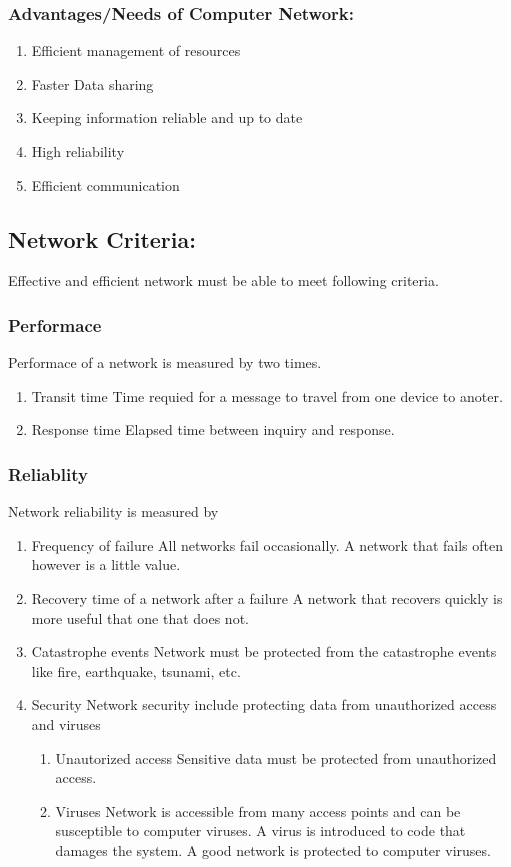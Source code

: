 \documentclass[11pt]{article}
\begin{document}
\subsubsection{Advantages/Needs of Computer Network:}
\label{sec:org07e17fa}
\begin{enumerate}
\item Efficient management of resources
\label{sec:org71c3d64}
\item Faster Data sharing
\label{sec:orgc71df5a}
\item Keeping information reliable and up to date
\label{sec:org68711f9}
\item High reliability
\label{sec:orgb7037c1}
\item Efficient communication
\label{sec:org1c1e376}
\end{enumerate}
\subsection{Network Criteria:}
\label{sec:org451ec03}
Effective and efficient network must be able to meet following criteria.
\subsubsection{Performace}
\label{sec:org939e43c}
Performace of a network is measured by two times.
\begin{enumerate}
\item Transit time
\label{sec:orgad8b35b}
Time requied for a message to travel from one device to anoter.
\item Response time
\label{sec:org875e993}
Elapsed time between inquiry and response.
\end{enumerate}
\subsubsection{Reliablity}
\label{sec:org56a9c6a}
Network reliability is measured by
\begin{enumerate}
\item Frequency of failure
\label{sec:orgdd186d3}
All networks fail occasionally.
A network that fails often however is a little value.
\item Recovery time of a network after a failure
\label{sec:orgda618d6}
A network that recovers quickly is more useful that one that does not.
\item Catastrophe events
\label{sec:orga5ccc70}
Network must be protected from the catastrophe events like fire, earthquake, tsunami, etc.
\item Security
\label{sec:orge484fc8}
Network security include protecting data from unauthorized access and viruses
\begin{enumerate}
\item Unautorized access
\label{sec:org6c3663e}
Sensitive data must be protected from unauthorized access.
\item Viruses
\label{sec:orgdcc3cd6}
Network is accessible from many access points and can be susceptible to computer viruses.
A virus is introduced to code that damages the system. A good network is protected to computer viruses.
\end{enumerate}
\end{enumerate}
\end{document}
